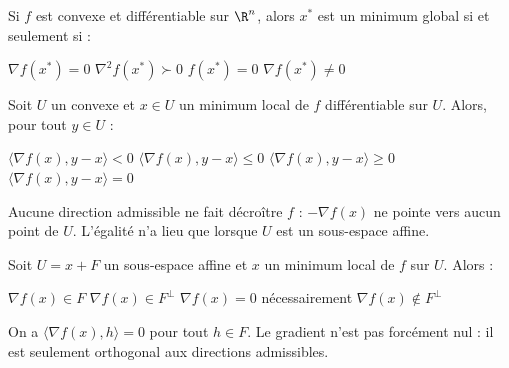 \begin{question}
Si $f$ est convexe et différentiable sur $\R^n$, alors $x^*$ est un minimum global si et seulement si :
\begin{reponses}
  \bonne $\nabla f(x^*)=0$
  \mauvaise $\nabla^2f(x^*)\succ0$
  \mauvaise $f(x^*)=0$
  \mauvaise $\nabla f(x^*)\neq0$
\end{reponses}
\end{question}

\begin{question}
Soit $U$ un convexe et $x\in U$ un minimum local de $f$ différentiable sur $U$. Alors, pour tout $y\in U$ :
\begin{reponses}
  \mauvaise $\langle\nabla f(x),y-x\rangle<0$
  \mauvaise $\langle\nabla f(x),y-x\rangle\le0$
  \bonne $\langle\nabla f(x),y-x\rangle\ge0$
  \mauvaise $\langle\nabla f(x),y-x\rangle=0$
\end{reponses}
\begin{explication}
Aucune direction admissible ne fait décroître $f$ : $-\nabla f(x)$ ne pointe vers aucun point de $U$. L'égalité n'a lieu que lorsque $U$ est un sous-espace affine.
\end{explication}
\end{question}

\begin{question}
Soit $U=x+F$ un sous-espace affine et $x$ un minimum local de $f$ sur $U$. Alors :
\begin{reponses}
  \mauvaise $\nabla f(x)\in F$
  \bonne $\nabla f(x)\in F^{\perp}$
  \mauvaise $\nabla f(x)=0$ nécessairement
  \mauvaise $\nabla f(x)\notin F^{\perp}$
\end{reponses}
\begin{explication}
On a $\langle\nabla f(x),h\rangle=0$ pour tout $h\in F$. Le gradient n'est pas forcément nul : il est seulement orthogonal aux directions admissibles.
\end{explication}
\end{question}
